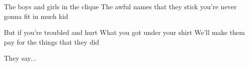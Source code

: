 \documentclass[../../../songbook.tex]{subfiles}
\begin{document}
The boys and girls in the clique   			\newline
The awful names that they stick    			\newline
you're never gonna fit in much kid   			\newline
  
But if you're troubled and hurt   					\newline
What you got under your shirt   					\newline
We'll make them pay for the things that they did   			\newline

\-\hspace{1cm} They say...     			\newline  
\end{document}
